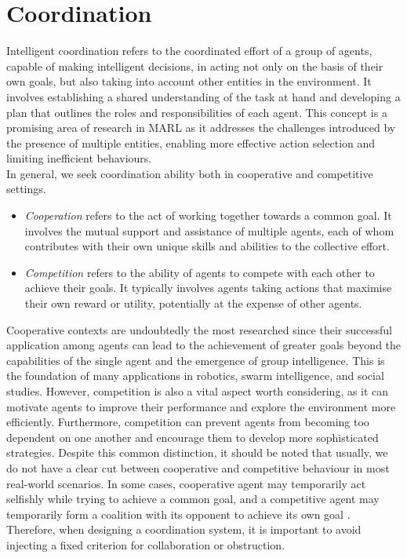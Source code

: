 \documentclass[a4paper,singleside,12pt]{report} %
\begin{document}
\section{Coordination}\label{coordination}

Intelligent coordination refers to the coordinated effort of a group of agents, capable of making intelligent decisions, in acting not only on the basis of their own goals, but also taking into account other entities in the environment. It involves establishing a shared understanding of the task at hand and developing a plan that outlines the roles and responsibilities of each agent. This concept is a promising area of research in MARL as it addresses the challenges introduced by the presence of multiple entities, enabling more effective action selection and limiting inefficient behaviours.\\
In general, we seek coordination ability both in cooperative and competitive settings.

\begin{itemize}
    \item \textit{Cooperation} refers to the act of working together towards a common goal. It involves the mutual support and assistance of multiple agents, each of whom contributes with their own unique skills and abilities to the collective effort.
    \item \textit{Competition} refers to the ability of agents to compete with each other to achieve their goals. It typically involves agents taking actions that maximise their own reward or utility, potentially at the expense of other agents.
\end{itemize}

Cooperative contexts are undoubtedly the most researched \cite{Cao2012AnOO} since their successful application among agents can lead to the achievement of greater goals beyond the capabilities of the single agent and the emergence of group intelligence. This is the foundation of many applications in robotics, swarm intelligence, and social studies. However, competition is also a vital aspect worth considering, as it can motivate agents to improve their performance and explore the environment more efficiently. Furthermore, competition can prevent agents from becoming too dependent on one another and encourage them to develop more sophisticated strategies. Despite this common distinction, it should be noted that usually, we do not have a clear cut between cooperative and competitive behaviour in most real-world scenarios. In some cases, cooperative agent may temporarily act selfishly while trying to achieve a common goal, and a competitive agent may temporarily form a coalition with its opponent to achieve its own goal \cite{Buoniu2008ACS, Hoen2005AnOO}. Therefore, when designing a coordination system, it is important to avoid injecting a fixed criterion for collaboration or obstruction.
\end{document}
